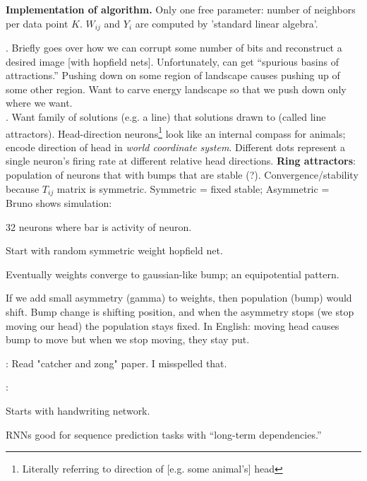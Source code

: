 \documentclass[12pt]{article}
\begin{document}
\p \textbf{Implementation of algorithm.} Only one free parameter: number of neighbors per data point $K$. $W_{ij}$ and $Y_i$ are computed by 'standard linear algebra'. 


\p {}. Briefly goes over how we can corrupt some number of bits and reconstruct a desired image [with hopfield nets]. Unfortunately, can get ``spurious basins of attractions.'' Pushing down on some region of landscape causes pushing up of some other region. Want to carve energy landscape so that we push down only where we want. \\

\p {}. Want family of solutions (e.g. a line) that solutions drawn to (called line attractors). Head-direction neurons\footnote{Literally referring to direction of [e.g. some animal's] head} look like an internal compass for animals; encode direction of head in \textit{world coordinate system}. Different dots represent a single neuron's firing rate at different relative head directions. \textbf{Ring attractors}: population of neurons that with bumps that are stable (?). Convergence/stability because $T_{ij}$ matrix is symmetric. Symmetric = fixed stable; Asymmetric =  \\

\p Bruno shows simulation:
\begin{compactitem}
	\item 32 neurons where bar is activity of neuron. 
	\item Start with random symmetric weight hopfield net.
	\item Eventually weights converge to gaussian-like bump; an equipotential pattern. 
	\item If we add small asymmetry (gamma) to weights, then population (bump) would shift. Bump change is shifting position, and when the asymmetry stops (we stop moving our head) the population stays fixed. In English: moving head causes bump to move but when we stop moving, they stay put. 
	\item {}: Read "catcher and zong" paper. I misspelled that. 
\end{compactitem}
\myspace

 : 
\begin{compactitem}[$\rightarrow$]
	\item Starts with handwriting network. 
	\item RNNs good for sequence prediction tasks with ``long-term dependencies.''
\end{compactitem}
\end{document}
